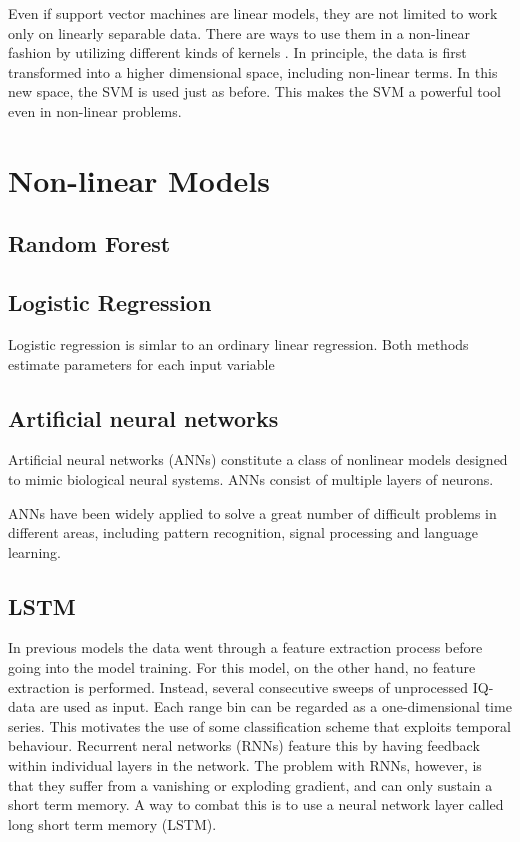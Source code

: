Even if support vector machines are linear models, they are not limited to work only on linearly separable data. There are ways to use them in a non-linear fashion by utilizing different kinds of kernels \citep{xia_2016}. In principle, the data is first transformed into a higher dimensional space, including non-linear terms. In this new space, the SVM is used just as before. This makes the SVM a powerful tool even in non-linear problems.

\section{Non-linear Models}

\subsection*{Random Forest}

\subsection*{Logistic Regression}
Logistic regression is simlar to an ordinary linear regression. Both methods estimate parameters for each input variable 

\subsection*{Artificial neural networks}

Artificial neural networks (ANNs) constitute a class of nonlinear models designed to mimic biological neural systems. ANNs consist of multiple layers of neurons. 


ANNs have been widely applied to solve a great number of difficult problems in different areas, including pattern recognition, signal processing and language learning. 


\subsection*{LSTM}
In previous models the data went through a feature extraction process before going into the model training. For this model, on the other hand, no feature extraction is performed. Instead, several consecutive sweeps of unprocessed IQ-data are used as input. Each range bin can be regarded as a one-dimensional time series. This motivates the use of some classification scheme that exploits temporal behaviour. Recurrent neral networks (RNNs) feature this by having feedback within individual layers in the network. \citep{karim_majumdar_darabi_chen_2018} The problem with RNNs, however, is that they suffer from a vanishing or exploding gradient, and can only sustain a short term memory. A way to combat this is to use a neural network layer called long short term memory (LSTM).

